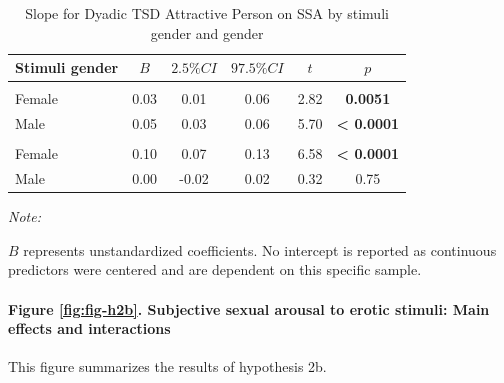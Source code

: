 \documentclass[
  bookmarksnumbered]{article}
\begin{document}
\begin{table}[H]
\centering
\caption{\label{tab:unnamed-chunk-23}Slope for Dyadic TSD Attractive Person on SSA by stimuli gender and gender}
\centering
\begin{threeparttable}
\begin{tabular}[t]{lccccc}
\toprule
Stimuli gender & $B$ & $2.5\% CI$ & $97.5\% CI$ & $t$ & $p$\\
\midrule
\addlinespace[0.3em]
\multicolumn{6}{l}{\cellcolor{lightgray}{Gender: Women}}\\
\hspace{1em}Female & 0.03 & 0.01 & 0.06 & 2.82 & \textbf{0.0051}\\
\hspace{1em}Male & 0.05 & 0.03 & 0.06 & 5.70 & \textbf{< 0.0001}\\
\addlinespace[0.3em]
\multicolumn{6}{l}{\cellcolor{lightgray}{Gender: Men}}\\
\hspace{1em}Female & 0.10 & 0.07 & 0.13 & 6.58 & \textbf{< 0.0001}\\
\hspace{1em}Male & 0.00 & -0.02 & 0.02 & 0.32 & 0.75\\
\bottomrule
\end{tabular}
\begin{tablenotes}[para]
\item \textit{Note: } 
\item $B$ represents unstandardized coefficients. No intercept is reported as 
    continuous predictors were centered and are dependent on this specific sample.
\end{tablenotes}
\end{threeparttable}
\end{table}

\paragraph{Figure \ref{fig:fig-h2b}. Subjective sexual arousal to erotic stimuli: Main effects and interactions}\label{figure-reffigfig-h2b.-subjective-sexual-arousal-to-erotic-stimuli-main-effects-and-interactions}

This figure summarizes the results of hypothesis 2b.
\end{document}
